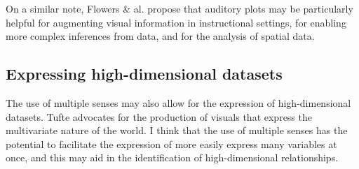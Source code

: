 \documentclass{acm_proc_article-sp}
\begin{document}
On a similar note,
Flowers \& al. \cite{flowers2005} propose that auditory plots may be
particularly helpful for augmenting visual information in instructional
settings, for enabling more complex inferences from data, and for
the analysis of spatial data.

\subsection{Expressing high-dimensional datasets}
The use of multiple senses may also allow for the expression of
high-dimensional datasets. Tufte advocates for the production of
visuals that express the multivariate nature of the world.\cite{tufte}
I think that the use of multiple senses has the potential to
facilitate the expression of more easily express many variables at
once, and this may aid in the identification of high-dimensional
relationships.



\balancecolumns
\end{document}
